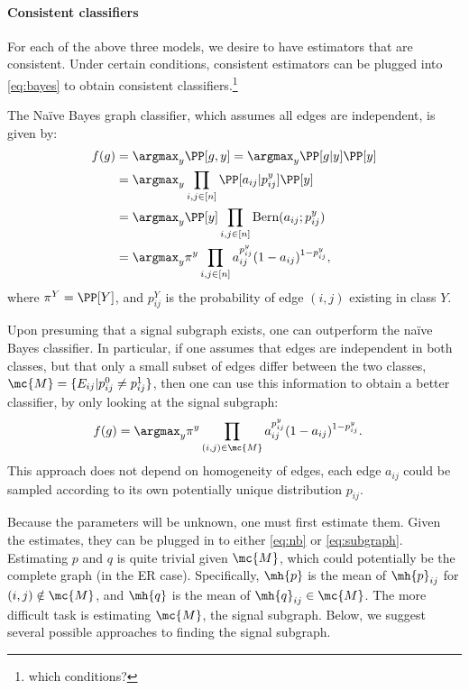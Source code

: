 

\paragraph{Consistent classifiers} %
\label{sub:model_based_consistent_classifiers}


For each of the above three models, we desire to have estimators that are consistent.  Under certain conditions, consistent estimators can be plugged into \eqref{eq:bayes} to obtain consistent classifiers.\footnote{which conditions?}  

The Na\"{i}ve Bayes graph classifier, which assumes all edges are independent, is given by:
\begin{align} \label{eq:nb}
	f(g) &= \argmax_y \PP[g,y] = \argmax_y \PP[g|y] \PP[y] 
	\nonumber \\&= \argmax_y \prod_{i,j\in[n]} \PP[a_{ij} | p_{ij}^y] \PP[y]
	\nonumber \\&= \argmax_y \PP[y] \prod_{i,j\in[n]} \text{Bern}(a_{ij}; p_{ij}^y) 
	\nonumber \\&= \argmax_y \pi^y \prod_{i,j\in[n]} a_{ij}^{p_{ij}^y} (1-a_{ij})^{1-p_{ij}^y}, 
\end{align}
where $\pi^Y=\PP[Y]$, and  $p_{ij}^Y$ is the probability of edge $(i,j)$ existing in class $Y$.  

Upon presuming that a signal subgraph exists, one can outperform the na\"{i}ve Bayes classifier.  In particular, if one assumes that edges are independent in both classes, but that only a small subset of edges differ between the two classes, $\mc{M}=\{E_{ij} | p_{ij}^0 \neq p_{ij}^1\}$, then one can use this information to obtain a better classifier, by only looking at the signal subgraph:
\begin{align} \label{eq:subgraph}
	f(g) &= \argmax_y \pi^y \prod_{(i,j) \in \mc{M}} a_{ij}^{p_{ij}^y} (1-a_{ij})^{1-p_{ij}^y}.
\end{align}
This approach does not depend on homogeneity of edges, each edge $a_{ij}$ could be sampled according to its own potentially unique distribution $p_{ij}$.  

Because the parameters will be unknown, one must first estimate them.  Given the estimates, they can be plugged in to either \eqref{eq:nb} or \eqref{eq:subgraph}.  Estimating $p$ and $q$ is quite trivial given $\mc{M}$, which could potentially be the complete graph (in the ER case).  Specifically, $\mh{p}$ is the mean of $\mh{p}_{ij}$ for $(i,j) \notin \mc{M}$, and $\mh{q}$ is the mean of $\mh{q}_{ij} \in \mc{M}$.  The more difficult task is estimating $\mc{M}$, the signal subgraph.  Below, we suggest several possible approaches to finding the signal subgraph.

